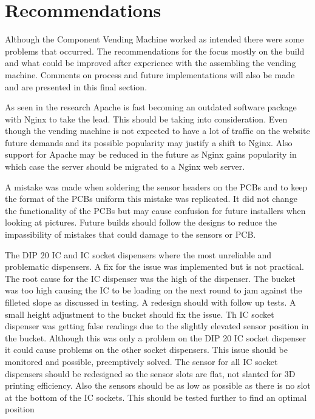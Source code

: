 \documentclass[a4paper,11pt]{article}
\numberwithin{figure}{section}
\numberwithin{table}{section}
\begin{document}
\newpage

\section{Recommendations}
Although the Component Vending Machine worked as intended there were some problems that occurred. The recommendations for the focus mostly on the build and what could be improved after experience with the assembling the vending machine. Comments on process and future implementations will also be made and are presented in this final section.

As seen in the research Apache is fast becoming an outdated software package with Nginx to take the lead. This should be taking into consideration. Even though the vending machine is not expected to have a lot of traffic on the website future demands and its possible popularity may justify a shift to Nginx. Also support for Apache may be reduced in the future as Nginx gains popularity in which case the server should be migrated to a Nginx web server. 

A mistake was made when soldering the sensor headers on the PCBs and to keep the format of the PCBs uniform this mistake was replicated. It did not change the functionality of the PCBs but may cause confusion for future installers when looking at pictures. Future builds should follow the designs to reduce the impassibility of mistakes that could damage to the sensors or PCB.

The DIP 20 IC and IC socket dispensers where the most unreliable and problematic dispensers. A fix for the issue was implemented but is not practical. The root cause for the IC dispenser was the high of the dispenser. The bucket was too high causing the IC to be loading on the next round to jam against the filleted slope as discussed in testing. A redesign should with follow up tests. A small height adjustment to the bucket should fix the issue. Th IC socket dispenser was getting false readings due to the slightly elevated sensor position in the bucket. Although this was only a problem on the DIP 20 IC socket dispenser it could cause problems on the other socket dispensers. This issue should be monitored and possible, preemptively solved. The sensor for all IC socket dispensers should be redesigned so the sensor slots are flat, not slanted for 3D printing efficiency. Also the sensors should be as low as possible as there is no slot at the bottom of the IC sockets. This should be tested further to find an optimal position
\end{document}
